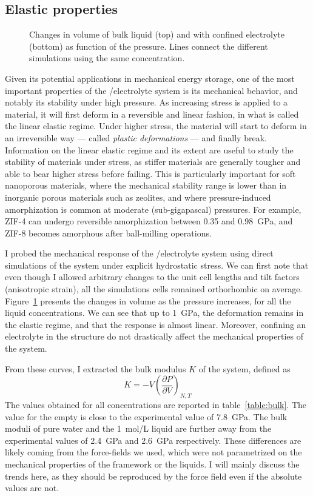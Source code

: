 \documentclass[thesis]{subfiles}
\begin{document}
\subsection{Elastic properties}

\begin{figure}[ht]
    \centering
    
    \caption{Changes in volume of bulk liquid (top) and  with confined electrolyte
    (bottom) as function of the pressure. Lines connect the different simulations
    using the same concentration.}
    \label{fig:licl-zif:pv}
\end{figure}

Given its potential applications in mechanical energy storage, one of the most
important properties of the /electrolyte system is its mechanical behavior,
and notably its stability under high pressure. As increasing stress is applied
to a material, it will first deform in a reversible and linear fashion, in what
is called the linear elastic regime. Under higher stress, the material will
start to deform in an irreversible way --- called \emph{plastic deformations}
--- and finally break. Information on the linear elastic regime and its extent
are useful to study the stability of materials under stress, as stiffer
materials are generally tougher and able to bear higher stress before failing.
This is particularly important for soft nanoporous materials, where the
mechanical stability range is lower than in inorganic porous materials such as
zeolites, and where pressure-induced amorphization is common at moderate
(sub-gigapascal) pressures. For example, ZIF-4 can undergo reversible
amorphization between 0.35 and \SI{0.98}{GPa}\cite{Bennett2011}, and ZIF-8
becomes amorphous after ball-milling operations\cite{Cao2012, AOrtiz2013}.

I probed the mechanical response of the /electrolyte system using direct
simulations of the system under explicit hydrostatic stress. We can first note
that even though I allowed arbitrary changes to the unit cell lengths and tilt
factors (anisotropic strain), all the simulations cells remained orthorhombic on
average. Figure~\ref{fig:licl-zif:pv} presents the changes in volume as the
pressure increases, for all the liquid concentrations. We can see that up to
\SI{1}{GPa}, the deformation remains in the elastic regime, and that the
response is almost linear. Moreover, confining an electrolyte in the 
structure do not drastically affect the mechanical properties of the system.

From these curves, I extracted the bulk modulus $K$ of the system, defined as
\[K = -V\left(\frac{\partial P}{\partial V}\right)_{N,T}\]
The values obtained for all concentrations are reported in
table~\ref{table:bulk}. The value for the empty  is close to the
experimental\cite{Tan2012} value of \SI{7.8}{GPa}. The bulk moduli of pure water
and the \SI{1}{mol/L} liquid are further away from the experimental
values\cite{Lanman1934} of \SI{2.4}{GPa} and \SI{2.6}{GPa} respectively. These
differences are likely coming from the force-fields we used, which were not
parametrized on the mechanical properties of the framework or the liquids. I
will mainly discuss the trends here, as they should be reproduced by the force
field even if the absolute values are not.
\end{document}
